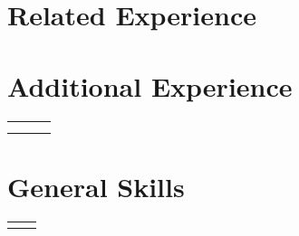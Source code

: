 \documentclass{article}
\begin{document}
\section{Related Experience}

    
    
    


\section{Additional Experience}

    \begin{flushleft}
        \begin{tabularx}{\textwidth}{l l R}
                      \\
             \\
                         \\
            
        \end{tabularx}
    \end{flushleft}


\section{General Skills}

    \begin{flushleft}
        \begin{tabular}{>{\raggedleft\arraybackslash}p{1.25in} >{\raggedright\arraybackslash}p{5.85in}}
             \\
             \\
            
        \end{tabular}
    \end{flushleft}
\end{document}
